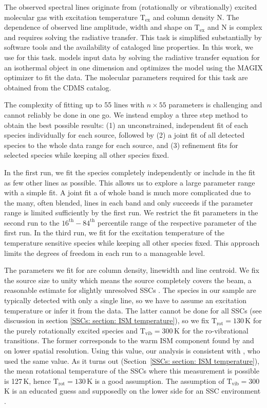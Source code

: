 The observed spectral lines originate from (rotationally or vibrationally) excited molecular gas with excitation temperature $\mathrm{T}_\mathrm{ex}$ and column density N. The dependence of observed line amplitude, width and shape on $\mathrm{T}_\mathrm{ex}$ and N is complex and requires solving the radiative transfer. This task is simplified substantially by software tools and the availability of cataloged line properties. In this work, we use \xclass for this task. \xclass models input data by solving the radiative transfer equation for an isothermal object in one dimension and optimizes the model using the \textsc{MAGIX} optimizer to fit the data.
The molecular parameters required for this task are obtained from the CDMS catalog.

The complexity of fitting up to 55 lines with $n \times 55$ parameters is challenging and cannot reliably be done in one go. We instead employ a three step method to obtain the best possible results: (1) an unconstrained, independent \xclass fit of each species individually for each source, followed by (2) a joint fit of all detected species to the whole data range for each source, and (3) refinement fits for selected species while keeping all other species fixed.

In the first run, we fit the species completely independently or include in the fit as few other lines as possible. This allows us to explore a large parameter range with a simple fit. 
A joint fit a of whole band is much more complicated due to the many, often blended, lines in each band and only succeeds if the parameter range is limited sufficiently by the first run. We restrict the fit parameters in the second run to the $16^\mathrm{th} - 84^\mathrm{th}$ percentile range of the respective parameter of the first run.
In the third run, we fit for the excitation temperature of the temperature sensitive species while keeping all other species fixed. 
This approach limits the degrees of freedom in each run to a manageable level. 

The parameters we fit for are column density, linewidth and line centroid. We fix the source size to unity which means the source completely covers the beam, a reasonable estimate for slightly unresolved SSCs . The species in our sample are typically detected with only a single line, so we have to assume an excitation temperature or infer it from the data. The latter cannot be done for all SSCs (see discussion in section \ref{SSCs: section: ISM temperature}), so we fix $\mathrm{T_{rot}}=130$\,K for the purely rotationally excited species and $\mathrm{T_{vib}}=300$\,K for the ro-vibrational transitions. The former corresponds to the warm ISM component found by \citet{2013ApJ...779...33M} and \citet{Gorski:2017es} on lower spatial resolution. Using this value, our analysis is consistent with , who used the same value. As it turns out (Section~\ref{SSCs: section: ISM temperature}), the mean rotational temperature of the SSCs where this measurement is possible is 127\,K, hence $\mathrm{T_{rot}}=130$\,K is a good assumption. 
The assumption of $\mathrm{T_{vib}}=300$\,K is an educated guess and supposedly on the lower side for an SSC environment \citep[compared to less extreme Galactic hot cores as in][]{1983ApJ...274..184G,1999A&A...341..882W}.

